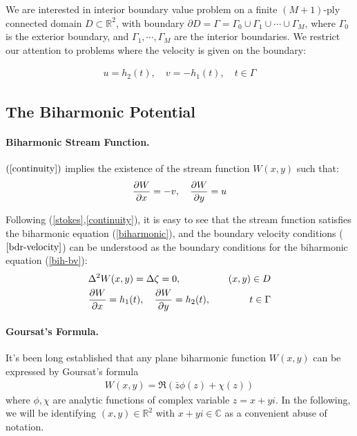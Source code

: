 \documentclass[10pt,twocolumn]{article}
\begin{document}
We are interested in interior boundary value problem on a finite $(M+1)$-ply connected domain $D\subset \mathbb R^2$,
with boundary $\partial D =  \Gamma = \Gamma_0 \cup \Gamma_1 \cup \cdots \cup \Gamma_M$, 
where $\Gamma_0$ is the exterior boundary, and $\Gamma_1,\cdots, \Gamma_M$ are the interior boundaries. We restrict our attention to 
problems where the velocity is given on the boundary:

\begin{align}
  u = h_2(t),\quad v = - h_1(t), \quad t\in \Gamma
  \label{bdr-velocity}
\end{align}

\subsection{The Biharmonic Potential}

\paragraph*{Biharmonic Stream Function.} $(\ref{continuity})$ implies the existence of the stream function $W(x,y)$ such that:
\begin{align}
  \pdv{W}{x} = -v,\quad \pdv{W}{y} = u \label{stream-1}
\end{align}

Following (\ref{stokes},\ref{continuity}), it is easy to see that the stream function satisfies the biharmonic equation (\ref{biharmonic}),
and the boundary velocity conditions ($\ref{bdr-velocity}$) can be understood as the boundary conditions for the biharmonic equation (\ref{bih-bv}):
\begin{align}
  &\Delta^2 W(x,y) = \Delta \zeta = 0, &(x,y)\in D \label{biharmonic}\\
  &\pdv{W}{x}(t) = h_1(t),\quad \pdv{W}{y}(t) = h_2(t), \quad &t\in \Gamma\label{bih-bv}
\end{align}

\paragraph*{Goursat's Formula.} It's been long established that any plane biharmonic function $W(x,y)$ can be expressed by Goursat's formula 
\begin{align}
  W(x,y) = \Re (\bar z \phi(z) + \chi (z)) \label{Goursat}
\end{align}
where $\phi, \chi$ are analytic functions of complex variable $z = x+yi$. In the following, we will be identifying $(x,y) \in \mathbb{R}^2$ with $x + yi\in \mathbb{C}$
as a convenient abuse of notation. 
\end{document}

